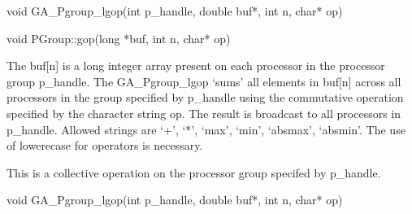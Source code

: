 \documentclass[12pt]{article}
\begin{document}

\begin{capi}
\begin{ccode}
void GA_Pgroup_lgop(int p_handle, double buf*, int n, char* op)
\end{ccode}
\begin{funcargs}
\end{funcargs}
\end{capi}

\begin{cxxapi}
\begin{cxxcode}
void PGroup::gop(long *buf, int n, char* op)
\end{cxxcode}
\begin{funcargs}
\end{funcargs}
\end{cxxapi}

\begin{desc}

The buf[n] is a long integer array present on each processor in the processor group p_handle. The GA_Pgroup_lgop `sums' all elements in buf[n] across all processors in the group specified by p_handle using the commutative operation specified by the character string op.  The result is broadcast to all processors in p_handle. Allowed strings are `+', `*', `max', `min', `absmax', `absmin'. The use of lowerecase for operators is necessary.

This is a collective operation on the processor group specifed by p_handle. 
\end{desc}


\begin{capi}
\begin{ccode}
void GA_Pgroup_lgop(int p_handle, double buf*, int n, char* op)
\end{ccode}
\begin{funcargs}
\end{funcargs}
\end{capi}
\end{document}
